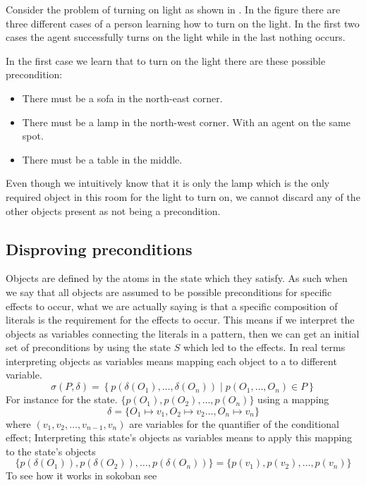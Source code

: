 \documentclass[\master/Master.tex]{subfiles}
\begin{document}
\begin{example}\label{ex:ca:light-on}
Consider the problem of turning on light as shown in .
In the figure there are three different cases of a person learning how to turn on the
light. In the first two cases the agent successfully turns on the light while in the last nothing occurs.

In the first case we learn that to turn on the light there are these possible precondition:
\begin{itemize}
	\item There must be a sofa in the north-east corner.
	\item There must be a lamp in the north-west corner. With an agent on the same spot.
	\item There must be a table in the middle.
\end{itemize}
Even though we intuitively know that it is only the lamp which is the only required object in this room for the light to turn on, we cannot discard any of the other objects present as not being a precondition.
\end{example}

\subsection{Disproving preconditions}
Objects are defined by the atoms in the state which they satisfy. As such when we say that all objects are assumed to be possible preconditions for specific effects to occur, what we are actually saying is that a specific composition of literals is the requirement for the effects to occur.
This means if we interpret the objects as variables connecting the literals in a pattern, then we can get an initial set of preconditions by using the state $S$ which led to the effects. In real terms interpreting objects as variables means mapping each object 
to a to different variable.
\begin{equation}\label{eq:ca:substitution}
	\sigma(P,\delta) =  \left\{p\left(\delta(O_1),\ldots,\delta(O_n) \right) \mid p(O_1,\ldots,O_n) \in P  \right\}
\end{equation}
For instance for the state.
$\{ p(O_1), p(O_2),\ldots,p(O_n)\}$ using a mapping
\begin{equation*}
\delta = \{O_1 \mapsto v_1, O_2 \mapsto v_2 \ldots, O_n \mapsto v_n\}
\end{equation*}
where $(v_1, v_2,\dots,v_{n-1},v_n)$ are variables for the quantifier of the conditional effect; Interpreting this state's objects as variables means to apply this mapping to the state's objects
\begin{equation*}
\{ p(\delta(O_1)), p(\delta(O_2)),\ldots,p(\delta(O_n))\} = \{ p(v_1), p(v_2),\ldots,p(v_n)\}
\end{equation*}
To see how it works in sokoban see 
\end{document}
